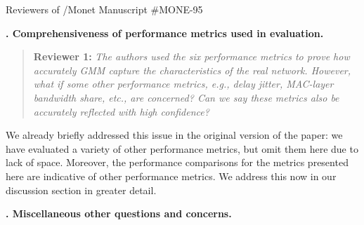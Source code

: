 \documentclass{letter}
\newcounter{topic}
\newcommand{\topic}[1]{
\addtocounter{topic}{1}
\textbf{\arabic{topic}. #1}
}
\newenvironment{reviewer}[1]%
{\begin{quote}\textbf{Reviewer #1:} \it}{\end{quote}}
\begin{document}
\begin{letter}{Reviewers of /Monet Manuscript \#MONE-95}
\topic{Comprehensiveness of performance metrics used in evaluation.}

\begin{reviewer}{1}
The authors used the six performance metrics to prove how accurately GMM capture the characteristics of the real network. However, what if some other performance metrics, e.g., delay jitter, MAC-layer bandwidth share, etc., are concerned? Can we say these metrics also be accurately reflected with high confidence?
\end{reviewer}

We already briefly addressed this issue in the original version of the paper:
we have evaluated a variety of other performance metrics, but omit them here due to lack of space.
Moreover, the performance comparisons for the metrics presented here are indicative of other performance metrics.
We address this now in our discussion section in greater detail.

\topic{Miscellaneous other questions and concerns.}



\end{letter}
\end{document}
